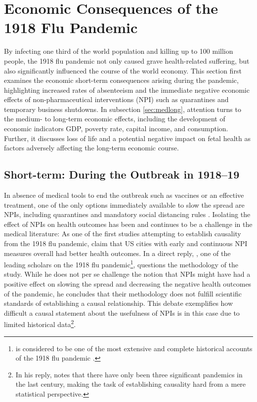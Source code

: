 \documentclass[12pt,a4paper]{article}
\begin{document}
\section{Economic Consequences of the 1918 Flu Pandemic}

By infecting one third of the world population and killing up to 100 million people, the 1918 flu pandemic not only caused grave health-related suffering, but also significantly influenced the course of the world economy.
This section first examines the economic short-term consequences arising during the pandemic, highlighting increased rates of absenteeism and the immediate negative economic effects of non-pharmaceutical interventions (NPI) such as quarantines and temporary business shutdowns.
In subsection \ref{sec:medlong}, attention turns to the medium- to long-term economic effects, including the development of economic indicators GDP, poverty rate, capital income, and consumption. 
Further, it discusses loss of life and a potential negative impact on fetal health as factors adversely affecting the long-term economic course.


	\subsection{Short-term: During the Outbreak in 1918--19} \label{subsec:short}

In absence of medical tools to end the outbreak such as vaccines or an effective treatment, one of the only options  immediately available to slow the spread are NPIs, including quarantines and mandatory social distancing rules \citep{aledortNonpharmaceuticalPublicHealth2007}.
Isolating the effect of NPIs on health outcomes has been and continues to be a challenge in the medical literature:
As one of the first studies attempting to establish causality from the 1918 flu pandemic, \cite{markelNonpharmaceuticalInterventionsImplemented2007} claim that US cities with early and continuous NPI measures overall had better health outcomes.
In a direct reply, \cite{barryCommentsNonpharmaceuticalInterventions2007}, one of the leading scholars on the 1918 flu pandemic\footnote{
	\cite{barryGreatInfluenzaEpic2005} is considered to be one of the most extensive and complete historical accounts of the 1918 flu pandemic \citep[see comment by the editor]{barryCommentsNonpharmaceuticalInterventions2007}.}, questions the methodology of the study.
While he does not per se challenge the notion that NPIs might have had a positive effect on slowing the spread and decreasing the negative health outcomes of the pandemic, he concludes that their methodology does not fulfill scientific standards of establishing a causal relationship.
This debate exemplifies how difficult a causal statement about the usefulness of NPIs is in this case due to limited historical data\footnote{In his reply, \cite{barryCommentsNonpharmaceuticalInterventions2007} notes that there have only been three significant pandemics in the last century, making the task of establishing causality hard from a mere statistical perspective.}.
\end{document}
